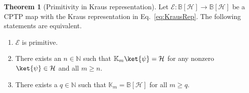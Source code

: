 \documentclass[preprint,pteplogo]{ptephy_v2}%
\numberwithin{equation}{section}
\theoremstyle{definition}
\newtheorem{theorem}{Theorem}
\newcommand{\mc}[1]{\mathcal{#1}}
\newcommand{\mbb}[1]{\mathbb{#1}}
\begin{document}
\begin{theorem}[Primitivity in Kraus representation]
\label{thm:PrimitivityByKraus}
Let $\mc{E}: \mbb{B}[\mc{H}] \to \mbb{B}[\mc{H}]$ be a CPTP map with the Kraus representation in Eq.~\eqref{eq:KrausRep}.
The following statements are equivalent.
\begin{enumerate}
\item $\mc{E}$ is primitive.
\item There exists an $n \in \mbb{N}$ such that $\mbb{K}_m \ket{\psi} = \mc{H}$ for any nonzero $\ket{\psi} \in \mc{H}$ and all $m \geq n$.
\item There exists a $q \in \mbb{N}$ such that $\mbb{K}_m = \mbb{B}[\mc{H}]$ for all $m \geq q$.
\end{enumerate}
\end{theorem}
\end{document}

